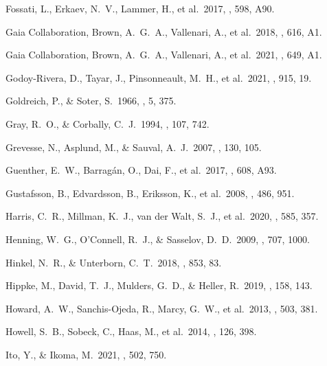  Fossati, L., Erkaev, N.~V., Lammer, H., et al.\ 2017, \aap, 598, A90.

 Gaia Collaboration, Brown, A.~G.~A., Vallenari, A., et al.\ 2018, \aap, 616, A1.

 Gaia Collaboration, Brown, A.~G.~A., Vallenari, A., et al.\ 2021, \aap, 649, A1.

 Godoy-Rivera, D., Tayar, J., Pinsonneault, M.~H., et al.\ 2021, \apj, 915, 19.

 Goldreich, P., \& Soter, S.\ 1966, \icarus, 5, 375.

 Gray, R.~O., \& Corbally, C.~J.\ 1994, \aj, 107, 742.

 Grevesse, N., Asplund, M., \& Sauval, A.~J.\ 2007, \ssr, 130, 105.

 Guenther, E.~W., Barrag{\'a}n, O., Dai, F., et al.\ 2017, \aap, 608, A93.

 Gustafsson, B., Edvardsson, B., Eriksson, K., et al.\ 2008, \aap, 486, 951.

 Harris, C.~R., Millman, K.~J., van der Walt, S.~J., et al.\ 2020, \nat, 585, 357.

 Henning, W.~G., O'Connell, R.~J., \& Sasselov, D.~D.\ 2009, \apj, 707, 1000.

 Hinkel, N.~R., \& Unterborn, C.~T.\ 2018, \apj, 853, 83.

 Hippke, M., David, T.~J., Mulders, G.~D., \& Heller, R.\ 2019, \aj, 158, 143.

 Howard, A.~W., Sanchis-Ojeda, R., Marcy, G.~W., et al.\ 2013, \nat, 503, 381.

 Howell, S.~B., Sobeck, C., Haas, M., et al.\ 2014, \pasp, 126, 398.

 Ito, Y., \& Ikoma, M.\ 2021, \mnras, 502, 750.

